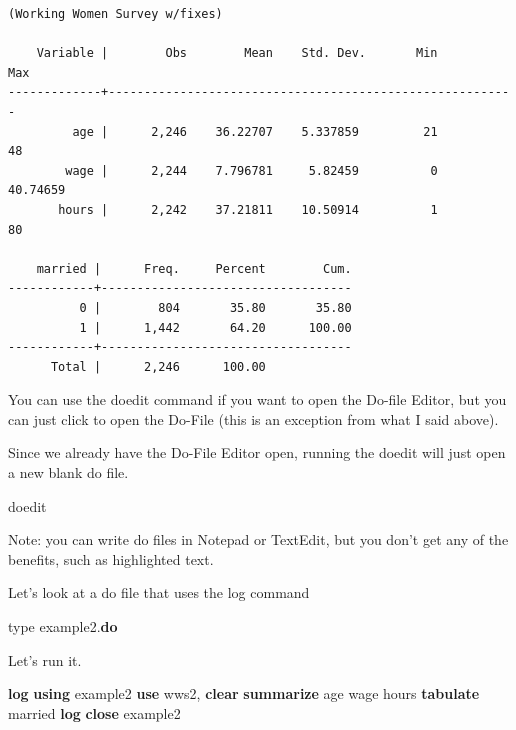 \documentclass[
]{book}
\newenvironment{Shaded}{\begin{snugshade}}{\end{snugshade}}
\newcommand{\DecValTok}[1]{\textcolor[rgb]{0.00,0.00,0.81}{#1}}
\newcommand{\FunctionTok}[1]{\textcolor[rgb]{0.13,0.29,0.53}{\textbf{#1}}}
\newcommand{\KeywordTok}[1]{\textcolor[rgb]{0.13,0.29,0.53}{\textbf{#1}}}
\newcommand{\NormalTok}[1]{#1}
\begin{document}
\begin{verbatim}
(Working Women Survey w/fixes)

    Variable |        Obs        Mean    Std. Dev.       Min        Max
-------------+---------------------------------------------------------
         age |      2,246    36.22707    5.337859         21         48
        wage |      2,244    7.796781     5.82459          0   40.74659
       hours |      2,242    37.21811    10.50914          1         80

    married |      Freq.     Percent        Cum.
------------+-----------------------------------
          0 |        804       35.80       35.80
          1 |      1,442       64.20      100.00
------------+-----------------------------------
      Total |      2,246      100.00
\end{verbatim}

You can use the doedit command if you want to open the Do-file Editor, but you can just click to open the Do-File (this is an exception from what I said above).

Since we already have the Do-File Editor open, running the doedit will just open a new blank do file.

\begin{Shaded}
\begin{Highlighting}[]
\NormalTok{doedit }
\end{Highlighting}
\end{Shaded}

Note: you can write do files in Notepad or TextEdit, but you don't get any
of the benefits, such as highlighted text.

Let's look at a do file that uses the log command

\begin{Shaded}
\begin{Highlighting}[]
\DecValTok{type}\NormalTok{ example2.}\KeywordTok{do}
\end{Highlighting}
\end{Shaded}

Let's run it.

\begin{Shaded}
\begin{Highlighting}[]
\FunctionTok{log} \KeywordTok{using}\NormalTok{ example2}
\KeywordTok{use}\NormalTok{ wws2, }\KeywordTok{clear}
\KeywordTok{summarize}\NormalTok{ age wage hours}
\KeywordTok{tabulate}\NormalTok{ married}
\FunctionTok{log} \KeywordTok{close}\NormalTok{ example2}
\end{Highlighting}
\end{Shaded}
\end{document}
